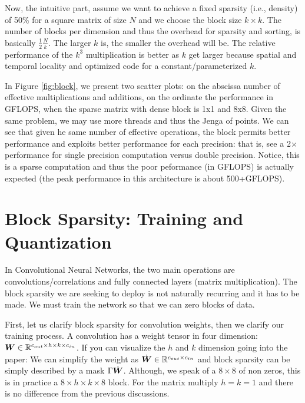 \documentclass[conference]{IEEEtran}
\begin{document}
Now, the intuitive part, assume we want to achieve a fixed sparsity
(i.e., density) of 50\% for a square matrix of size $N$ and we choose
the block size $k \times k$. The number of blocks per dimension and
thus the overhead for sparsity and sorting, is basically
$\frac{1}{2}\frac{N}{k}$. The larger $k$ is, the smaller the overhead
will be.  The relative performance of the $k^3$ multiplication is
better as $k$ get larger because spatial and temporal locality and
optimized code for a constant/parameterized $k$.

 In Figure \ref{fig:block}, we present two
scatter plots: on the abscissa number of effective multiplications and
additions, on the ordinate the performance in GFLOPS, when the sparse
matrix with dense block is 1x1 and 8x8. Given the same problem, we may
use more threads and thus the Jenga of points.  We can see that given
he same number of effective operations, the block permits better
performance and exploits better performance for each precision: that
is, see a 2{$\times$} performance for single precision computation
versus double precision. Notice, this is a sparse computation and thus
the poor peformance (in GFLOPS) is actually expected (the peak
performance in this architecture is about 500+GFLOPS).




\section{Block Sparsity: Training and Quantization}
\label{sec:training}

In Convolutional Neural Networks, the two main operations are
convolutions/correlations and fully connected layers (matrix
multiplication). The block sparsity we are seeking to deploy is not
naturally recurring and it has to be made. We must train the network
so that we can zero blocks of data.

First, let us clarify block sparsity for convolution weights, then we
clarify our training process. A convolution has a weight tensor in
four dimension: ${\boldsymbol W} \in \mathbb{R}^{c_{out}\times h \times k \times
  c_{in}}$. If you can visualize the $h$ and $k$ dimension going into
the paper: We can simplify the weight as $\dot{{\boldsymbol W}} \in \mathbb{R}^{c_{out}
  \times c_{in}}$ and block sparsity can be simply described by a mask
$\Gamma\dot{{\boldsymbol W}}$. Although, we speak of a $8\times 8$ of non
zeros, this is in practice a $8\times h\times k\times 8$ block. For
the matrix multiply $h=k=1$ and there is no difference from the
previous discussions.
\end{document}
